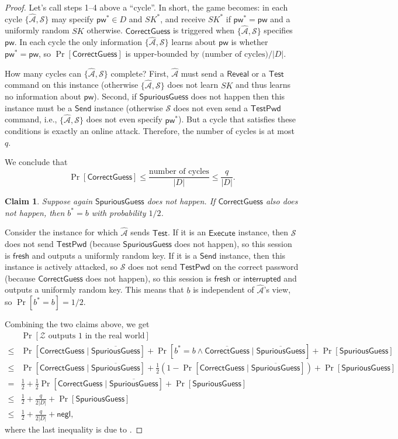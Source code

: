 \documentclass{article}
\newtheorem{claim}{Claim}
\newcommand{\negl}{\mathsf{negl}}
\newcommand{\adv}{\mathcal{A}}
\newcommand{\env}{\mathcal{Z}}
\renewcommand{\sim}{\mathcal{S}}
\newcommand{\pw}{\mathsf{pw}}
\newcommand{\TestPwd}{\mathsf{TestPwd}}
\newcommand{\fresh}{\mathsf{fresh}}
\newcommand{\interrupted}{\mathsf{interrupted}}
\newcommand{\Execute}{\mathsf{Execute}}
\newcommand{\Send}{\mathsf{Send}}
\newcommand{\Reveal}{\mathsf{Reveal}}
\newcommand{\Test}{\mathsf{Test}}
\newcommand{\SpuriousGuess}{\mathsf{SpuriousGuess}}
\newcommand{\CorrectGuess}{\mathsf{CorrectGuess}}
\begin{document}
\begin{proof}
Let's call steps 1--4 above a ``cycle''. In short, the game becomes: in each cycle $\{\widehat{\adv}, \sim\}$ may specify $\pw^* \in D$ and $SK^*$, and receive $SK^*$ if $\pw^* = \pw$ and a uniformly random $SK$ otherwise. $\CorrectGuess$ is triggered when $\{\widehat{\adv}, \sim\}$ specifies $\pw$. In each cycle the only information $\{\widehat{\adv}, \sim\}$ learns about $\pw$ is whether $\pw^* = \pw$, so $\Pr[\CorrectGuess]$ is upper-bounded by $\text{(number of cycles)}/|D|$.

How many cycles can $\{\widehat{\adv}, \sim\}$ complete? First, $\widehat{\adv}$ must send a $\Reveal$ or a $\Test$ command on this instance (otherwise $\{\widehat{\adv}, \sim\}$ does not learn $SK$ and thus learns no information about $\pw$). Second, if $\SpuriousGuess$ does not happen then this instance must be a $\Send$ instance (otherwise $\sim$ does not even send a $\TestPwd$ command, i.e., $\{\widehat{\adv}, \sim\}$ does not even specify $\pw^*$). But a cycle that satisfies these conditions is exactly an online attack. Therefore, the number of cycles is at most $q$.

We conclude that
\[
\Pr[\CorrectGuess] \leq \frac{\text{number of cycles}}{|D|} \leq \frac{q}{|D|}.
\]
\begin{claim}
Suppose again $\SpuriousGuess$ does not happen. If $\CorrectGuess$ also does not happen, then $b^* = b$ with probability $1/2$.
\end{claim}
Consider the instance for which $\widehat{\adv}$ sends $\Test$. If it is an $\Execute$ instance, then $\sim$ does not send $\TestPwd$ (because $\SpuriousGuess$ does not happen), so this session is $\fresh$ and outputs a uniformly random key. If it is a $\Send$ instance, then this instance is actively attacked, so $\sim$ does not send $\TestPwd$ on the correct password (because $\CorrectGuess$ does not happen), so this session is $\fresh$ or $\interrupted$ and outputs a uniformly random key. This means that $b$ is independent of $\widehat{\adv}$'s view, so $\Pr[b^* = b] = 1/2$.

\medskip
Combining the two claims above, we get
\begin{align*}
&\Pr[\env\text{ outputs }1\text{ in the real world}] \\
\leq& \Pr[\CorrectGuess \mid \overline{\SpuriousGuess}] + \Pr[b^* = b \land \overline{\CorrectGuess} \mid \overline{\SpuriousGuess}] + \Pr[\SpuriousGuess] \\
\leq& \Pr[\CorrectGuess \mid \overline{\SpuriousGuess}] + \frac{1}{2}(1 - \Pr[\CorrectGuess \mid \overline{\SpuriousGuess}]) + \Pr[\SpuriousGuess] \\
=& \frac{1}{2} + \frac{1}{2}\Pr[\CorrectGuess \mid \overline{\SpuriousGuess}] + \Pr[\SpuriousGuess] \\
\leq& \frac{1}{2} + \frac{q}{2|D|} + \Pr[\SpuriousGuess] \\
\leq& \frac{1}{2} + \frac{q}{2|D|} + \negl,
\end{align*}
where the last inequality is due to .

\end{proof}
\end{document}
